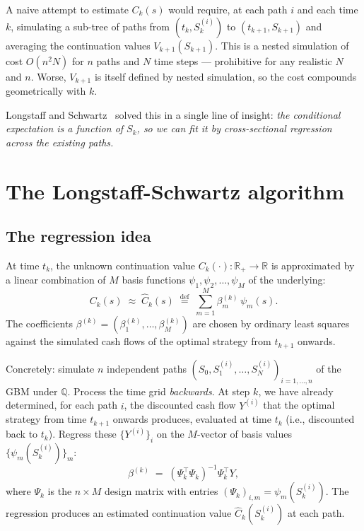 \documentclass[11pt,a4paper]{article}
\theoremstyle{plain}
\theoremstyle{definition}
\theoremstyle{remark}
\newcommand{\R}{\mathbb{R}}
\newcommand{\Q}{\mathbb{Q}}
\newcommand{\eqdef}{\overset{\mathrm{def}}{=}}
\begin{document}
A naive attempt to estimate $C_k(s)$ would require, at each path
$i$ and each time $k$, simulating a sub-tree of paths from
$(t_k, S_k^{(i)})$ to $(t_{k+1}, S_{k+1})$ and averaging the
continuation values $V_{k+1}(S_{k+1})$. This is a nested simulation
of cost $O(n^2 N)$ for $n$ paths and $N$ time steps --- prohibitive
for any realistic $N$ and $n$. Worse, $V_{k+1}$ is itself defined by
nested simulation, so the cost compounds geometrically with $k$.

Longstaff and Schwartz~\cite{LongstaffSchwartz2001} solved this in a
single line of insight: \emph{the conditional expectation is a
function of $S_k$, so we can fit it by cross-sectional regression
across the existing paths.}

\section{The Longstaff-Schwartz algorithm}
\label{sec:lsm}

\subsection{The regression idea}

At time $t_k$, the unknown continuation value $C_k(\cdot): \R_+ \to
\R$ is approximated by a linear combination of $M$ basis functions
$\psi_1, \psi_2, \ldots, \psi_M$ of the underlying:
\begin{equation}
C_k(s) \;\approx\; \widehat C_k(s) \;\eqdef\;
\sum_{m=1}^M \beta_m^{(k)}\, \psi_m(s).
\end{equation}
The coefficients $\beta^{(k)} = (\beta_1^{(k)}, \ldots, \beta_M^{(k)})$
are chosen by ordinary least squares against the simulated cash flows
of the optimal strategy from $t_{k+1}$ onwards.

Concretely: simulate $n$ independent paths
$(S_0, S_1^{(i)}, \ldots, S_N^{(i)})_{i = 1, \ldots, n}$ of the GBM
under $\Q$. Process the time grid \emph{backwards}. At step $k$, we
have already determined, for each path $i$, the discounted cash flow
$Y^{(i)}$ that the optimal strategy from time $t_{k+1}$ onwards
produces, evaluated at time $t_k$ (i.e., discounted back to $t_k$).
Regress these $\{Y^{(i)}\}_i$ on the $M$-vector of basis values
$\{\psi_m(S_k^{(i)})\}_m$:
\begin{equation}
\beta^{(k)} \;=\; (\Psi_k^\top \Psi_k)^{-1} \Psi_k^\top Y,
\label{eq:ols}
\end{equation}
where $\Psi_k$ is the $n \times M$ design matrix with entries
$(\Psi_k)_{i, m} = \psi_m(S_k^{(i)})$. The regression produces an
estimated continuation value $\widehat C_k(S_k^{(i)})$ at each path.
\end{document}
